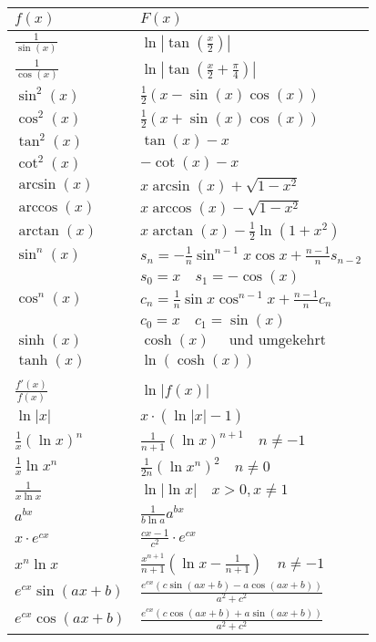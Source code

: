\documentclass[a4paper,10pt]{scrartcl}
\begin{document}
\begin{multicols}{2}
	\columnbreak
	\hspace{-20pt}
	\begin{tabular}{l|l}
		$f(x)$ & $F(x)$ \\ \hline
		
		$ \frac{1}{\sin(x)} $  &  $ \ln \left|\tan(\frac{x}{2})\right| $ \\
		$ \frac{1}{\cos(x)} $  &  $ \ln \left|\tan(\frac{x}{2}+\frac{\pi}{4})\right| $ \\
		$ \sin^2(x) $  &  $ \frac{1}{2} (x-\sin(x)\cos(x)) $ \\
		$ \cos^2(x) $  &  $ \frac{1}{2} (x+\sin(x)\cos(x)) $ \\
		$ \tan^2(x) $  &  $ \tan(x)-x $ \\
		$ \cot^2(x) $  &  $ -\cot(x)-x $ \\
		$ \arcsin(x) $  &  $ x \arcsin(x) + \sqrt{1-x^2} $ \\
		$ \arccos(x) $  &  $ x \arccos(x) - \sqrt{1-x^2} $ \\
		$ \arctan(x) $  &  $ x \arctan(x) - \frac{1}{2} \ln (1+x^2) $ \\
		$ \sin^n(x) $  &  $ \scriptstyle s_n=-\frac{1}{n} \sin^{n-1}x \cos x+\frac{n-1}{n} s_{n-2} $ \\
		$  $  &  $ \scriptstyle s_0 = x\quad s_1 = - \cos(x) $ \\
		$ \cos^n(x) $  &  $ \scriptstyle c_n=\frac{1}{n} \sin x \cos^{n-1} x + \frac{n-1}{n} c_n $ \\
		$  $  &  $ \scriptstyle c_0 = x\quad c_1 = \sin(x) $ \\
		$ \sinh(x) $  &  $ \cosh(x)\quad \text{ und umgekehrt} $ \\
		$ \tanh(x) $  &  $ \ln(\cosh(x)) $ \\
		$  $  &  $  $ \\
		$ \frac{f'(x)}{f(x)} $   &   $ \ln {| f(x) |} $ \\
		$ \ln |x| $  &  $ x \cdot (\ln |x| - 1) $ \\
		$ \frac{1}{x}(\ln x)^n $  &  $ \frac{1}{n+1} (\ln x)^{n+1} \quad \scriptstyle  n \neq -1 $ \\
		$ \frac{1}{x}\ln x^n $  &  $ \frac{1}{2n} (\ln x^n)^{2} \quad \scriptstyle  n \neq 0 $ \\
		$ \frac{1}{x \ln x} $  &  $ \ln |\ln x| \quad \scriptstyle x>0,x\neq 1 $ \\
		$ a^{bx} $  &  $ \frac{1}{b \ln a} a^{bx} $ \\
		$ x\cdot e^{cx} $  &  $ \frac{cx-1}{c^2} \cdot e^{cx} $ \\
		$ x^n \ln x $  &  $ \frac{x^{n+1}}{n+1} \left( \ln x - \frac{1}{n+1} \right) \quad \scriptstyle  n \neq -1 $ \\
		$ \scriptstyle e^{cx} \sin (ax+b)  $  &  $ \frac{e^{cx} \left( c \sin (ax+b)-a \cos(ax+b) \right)}{a^2+c^2}  $ \\
		$ \scriptstyle e^{cx} \cos (ax+b)  $  &  $ \frac{e^{cx} \left( c \cos (ax+b)+a \sin(ax+b) \right)}{a^2+c^2}  $ \\
	\end{tabular}
\end{multicols}
\end{document}
